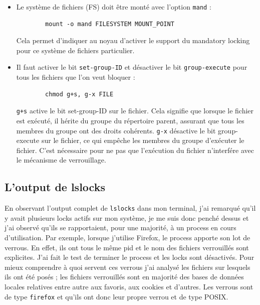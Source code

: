 \begin{itemize}
  \item Le système de fichiers (FS) doit être monté avec l'option \texttt{mand} :
        \begin{verbatim}
        mount -o mand FILESYSTEM MOUNT_POINT
        \end{verbatim}
    Cela permet d'indiquer au noyau d'activer le support du mandatory locking pour ce système de fichiers particulier. \newline
    
  \item Il faut activer le bit \texttt{set-group-ID} et désactiver le bit \texttt{group-execute} pour tous les fichiers que l'on veut bloquer :
        \begin{verbatim}
        chmod g+s, g-x FILE
        \end{verbatim}
        \texttt{g+s} active le bit set-group-ID sur le fichier. Cela signifie que lorsque le fichier est exécuté, il hérite du groupe du répertoire parent, assurant que tous les membres du groupe ont des droits cohérents.
        \newline
        \texttt{g-x} désactive le bit group-execute sur le fichier, ce qui empêche les membres du groupe d'exécuter le fichier. C'est nécessaire pour ne pas que l'exécution du fichier n'interfére avec le mécanisme de verrouillage.
\end{itemize}

\subsection{L'output de lslocks}
En observant l'output complet de \texttt{lslocks} dans mon terminal, j'ai remarqué qu'il y avait plusieurs locks actifs sur mon système, je me suis donc penché dessus et j'ai observé qu'ils se rapportaient, pour une majorité, à un process en cours d'utilisation. Par exemple, lorsque j'utilise Firefox, le process apporte son lot de verrous. En effet, ils ont tous le même pid et le nom des fichiers verrouillés sont explicites. J'ai fait le test de terminer le process et les locks sont désactivés. Pour mieux comprendre à quoi servent ces verrous j'ai analysé les fichiers sur lesquels ils ont été posés ; les fichiers verrouillés sont en majorité des bases de données locales relatives entre autre aux favoris, aux cookies et d'autres. Les verrous sont de type \texttt{firefox} et qu'ils ont donc leur propre verrou et de type POSIX.

